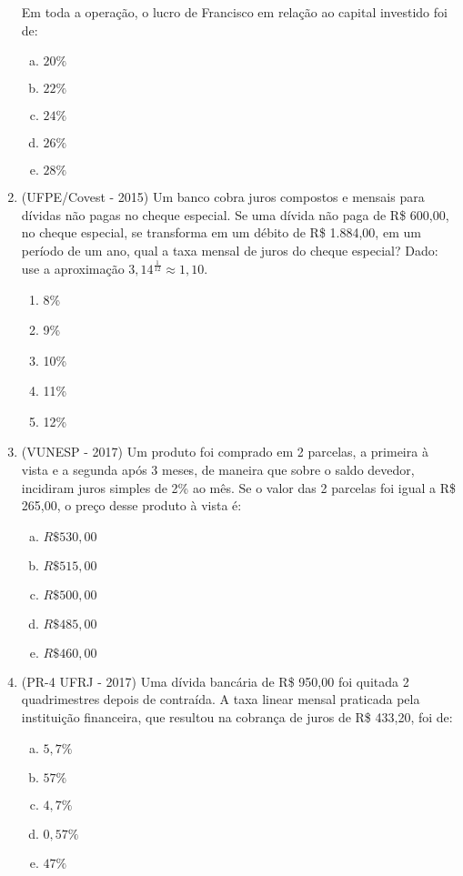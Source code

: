 \begin{enumerate}
  Em toda a operação, o lucro de Francisco em relação ao capital investido foi de:
  \begin{enumerate}[a)]
  \item $20\%$
  \item $22\%$
  \item $24\%$
  \item $26\%$
  \item $28\%$
  \end{enumerate}
  
  \item (UFPE/Covest - 2015) Um banco cobra juros compostos e mensais para dívidas não pagas no cheque especial. Se uma dívida não paga de R\$ 600,00, no cheque especial, se transforma em um débito de R\$ 1.884,00, em um período de um ano, qual a taxa mensal de juros do cheque especial? Dado: use a aproximação $3,14^{\frac{1}{12}} \approx 1,10$.
  \begin{enumerate}
  \item 8\%
  \item 9\%
  \item 10\%
  \item 11\%
  \item 12\%
  \end{enumerate}
  
  \item (VUNESP - 2017) Um produto foi comprado em 2 parcelas, a primeira à vista e a segunda após 3 meses, de maneira que sobre o saldo devedor, incidiram juros simples de 2\% ao mês. Se o valor das 2 parcelas foi igual a R\$ 265,00, o preço desse produto à vista é:
  \begin{enumerate}[a)]
  \item $R\$ 530,00$
  \item $R\$ 515,00$
  \item $R\$ 500,00$
  \item $R\$ 485,00$
  \item $R\$ 460,00$
  \end{enumerate}
  
  \item (PR-4 UFRJ - 2017) Uma dívida bancária de R\$ 950,00 foi quitada 2 quadrimestres depois de contraída. A taxa linear mensal praticada pela instituição financeira, que resultou na cobrança de juros de R\$ 433,20, foi de:
   \begin{enumerate}[a)]
  \item $5,7\%$
  \item $57\%$
  \item $4,7\%$
  \item $0,57\%$
  \item $47\%$
  \end{enumerate}
  

\end{enumerate}
